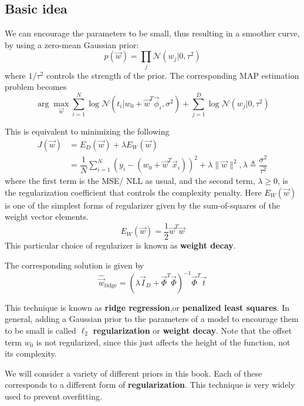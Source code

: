 \subsection{Basic idea}
We can encourage the parameters to be small, thus resulting in a smoother curve, by using a zero-mean Gaussian prior:
\begin{equation}
p(\vec{w})=\prod\limits_j \mathcal{N}(w_j|0,\tau^2)
\end{equation}
where $1/\tau^2$ controls the strength of the prior. The corresponding MAP estimation problem becomes
\begin{equation}
\arg\max_{\vec{w}} \sum\limits_{i=1}^N \log{\mathcal{N}(t_i|w_0+\vec{w}^T\vec{\phi}_i,\sigma^2)}+\sum\limits_{j=1}^D \log{\mathcal{N}(w_j|0,\tau^2)}
\end{equation}

This is equivalent to minimizing the following
\begin{align}\label{eqn:Ridge-regression-J}
J(\vec{w})&=E_D(\vec{w})+\lambda E_W(\vec{w}) \\
&=\dfrac{1}{N}\sum\limits_{i=1}^N (y_i-(w_0+\vec{w}^T\vec{x}_i))^2+\lambda\lVert\vec{w}\rVert^2 , \lambda \triangleq \dfrac{\sigma^2}{\tau^2}
\end{align}
where the first term is the MSE/ NLL as usual, and the second term, $\lambda \geq 0$, is the regularization coefficient that controls the complexity penalty.
Here $E_W(\vec{w})$ is one of the simplest forms of regularizer given by the sum-of-squares of the weight vector elements.
\begin{equation}
E_W(\vec{w})=\dfrac{1}{2}\vec{w}^T\vec{w}
\end{equation}
This particular choice of regularizer is known as \textbf{weight decay}.

The corresponding solution is given by
\begin{equation}\label{eqn:Ridge-regression-solution}
\hat{\vec{w}}_{\mathrm{ridge}}=(\lambda\vec{I}_D+\vec{\Phi}^T\vec{\Phi})^{-1}\vec{\Phi}^T\vec{t}
\end{equation}

This technique is known as \textbf{ridge regression},or \textbf{penalized least squares}. In general, adding a Gaussian prior to the parameters of a model to encourage them to be small is called $\ell_2$ \textbf{regularization} or \textbf{weight decay}. Note that the offset term $w_0$ is not regularized, since this just affects the height of the function, not its complexity.

We will consider a variety of different priors in this book. Each of these corresponds to a different form of \textbf{regularization}. This technique is very widely used to prevent overfitting.

